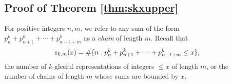 \documentclass[11pt]{amsart}
\newcommand{\p}[1]{\left(#1\right)}
\numberwithin{equation}{section}
\numberwithin{algorithm}{section}
\begin{document}
%
%
%
%
%
%
%


\subsection{Proof of Theorem \ref{thm:skxupper}}
For positive integers $n,m$, we refer to any sum of the form
$p_n^k + p_{n+1}^k + \cdots + p_{n-1+m}^k$
as a \textit{chain} of length $m$.
Recall that $${s_{k,m}}(x) = \#\{n:p_n^k + p_{n+1}^k + \cdots + p_{n-1+m}^k \leq x\},$$
the number of $k$-gleeful representations of integers $\le x$ of length $m$,
or the number of chains of length $m$ whose sums are bounded by $x$.
\end{document}
